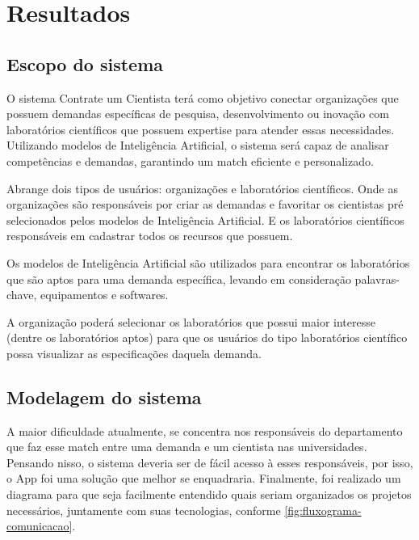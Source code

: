 \chapter{Resultados}\label{cap:resultados}

\section{Escopo do sistema}\label{sec:escopoSistema}

O sistema Contrate um Cientista terá como objetivo conectar organizações que possuem demandas específicas de pesquisa, desenvolvimento ou inovação com laboratórios científicos 
que possuem expertise para atender essas necessidades. Utilizando modelos de Inteligência Artificial, o sistema será capaz de analisar competências e demandas, garantindo um 
match eficiente e personalizado.

Abrange dois tipos de usuários: organizações e laboratórios científicos. Onde as organizações são responsáveis por criar as demandas e favoritar os cientistas 
pré selecionados pelos modelos de Inteligência Artificial. E os laboratórios científicos responsáveis em cadastrar todos os recursos que possuem.

Os modelos de Inteligência Artificial são utilizados para encontrar os laboratórios que são aptos para uma demanda específica, levando em consideração palavras-chave, 
equipamentos e softwares.

A organização poderá selecionar os laboratórios que possui maior interesse (dentre os laboratórios aptos) para que os usuários do tipo laboratórios científico possa 
visualizar as especificações daquela demanda.

\section{Modelagem do sistema}\label{sec:modelagemSistema}

A maior dificuldade atualmente, se concentra nos responsáveis do departamento que faz esse match entre uma demanda e um cientista nas universidades.
Pensando nisso, o sistema deveria ser de fácil acesso à esses responsáveis, por isso, o App foi uma solução que melhor se enquadraria. 
Finalmente, foi realizado um diagrama para que seja facilmente entendido quais seriam organizados os projetos necessários, juntamente com suas tecnologias, conforme \autoref{fig:fluxograma-comunicacao}.

